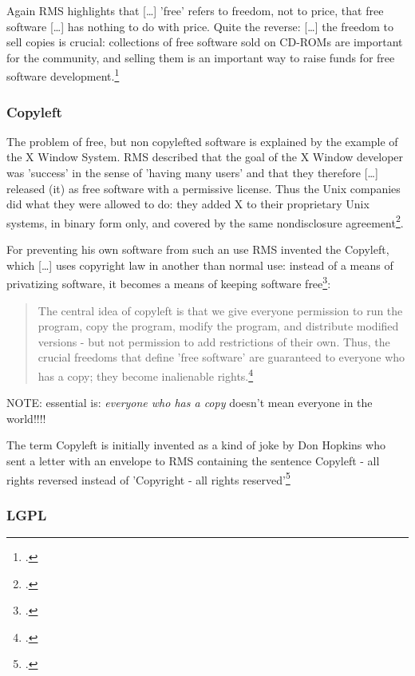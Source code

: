 \documentclass[DIV=calc,BCOR=5mm,11pt,headings=small,oneside,abstract=true, toc=bib]{scrartcl}
\begin{document}
Again RMS highlights that \glqq{}[\ldots] ’free’ refers to freedom, not to
price\grqq{}, that free software \glqq{}[\ldots] has nothing to do with
price\grqq{}. Quite the reverse: \glqq{}[\ldots] the freedom to sell copies is
crucial: collections of free software sold on CD-ROMs are important for the
community, and selling them is an important way to raise funds for free software
development.\grqq{}\footcite[cf][18]{Stallman1999a} 

\subsubsection{\glqq{}Copyleft\grqq{}}
The problem of free, but non copylefted software is explained by the example of
the X Window System. RMS described that the goal of the X Window developer was
’success’ in the sense of ’having many users’ and that they therefore
\glqq{}[\ldots] released (it) as free software with a permissive license\grqq{}.
Thus the Unix companies did what they were allowed to do: \glqq{}they added X to
their proprietary Unix systems, in binary form only, and covered by the same
nondisclosure agreement\grqq{}\footcite[cf][20]{Stallman1999a}. 

For preventing his own software from such an use RMS invented the
\glqq{}Copyleft\grqq{}, which \glqq{}[\ldots] uses copyright law\grqq{} in
another than normal use: \glqq{}instead of a means of privatizing software, it
becomes a means of keeping software free\grqq{}\footcite[cf][20]{Stallman1999a}:
\begin{quote}\glqq{}The central idea of copyleft is that we give everyone
permission to run the program, copy the program, modify the program, and
distribute modified versions - but not permission to add restrictions of their
own. Thus, the crucial freedoms that define ’free software’ are guaranteed to
everyone who has a copy; they become inalienable
rights.\grqq{}\footcite[cf][20]{Stallman1999a}
\end{quote}

NOTE: essential is: \emph{everyone who has a copy} doesn’t mean everyone
in the world!!!!

The term Copyleft is initially invented as a kind of joke by \glqq{}Don
Hopkins\grqq{} who sent a letter with an envelope to RMS containing the sentence
\glqq{} Copyleft - all rights reversed\grqq{} instead of ’Copyright - all rights
reserved’\footcite[cf][21]{Stallman1999a} 


\subsubsection{LGPL}
\end{document}
